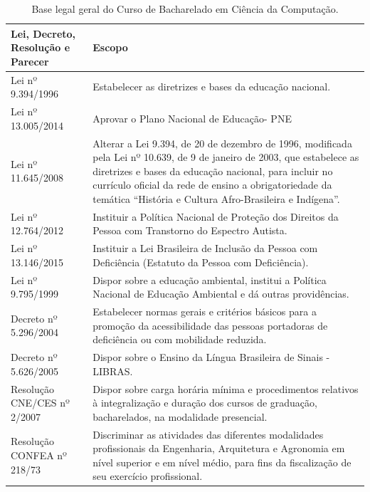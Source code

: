 \documentclass[
	12pt,				%
	openright,			%
  oneside,     %
	a4paper,			%
	english,			%
	french,				%
	spanish,			%
	brazil				%
	]{abntex2}
\begin{document}
\begin{center}
    
    \begin{scriptsize}
        \begin{longtable}{@{}lp{8.7cm}}
            \caption{\label{quadro:base-legal-geral-curso}Base legal geral do Curso de Bacharelado em Ciência da Computação.}\\
    \toprule
    \textbf{Lei, Decreto, Resolução e Parecer} & \textbf{Escopo} \\ 
    \midrule
    Lei nº 9.394/1996 & Estabelecer as diretrizes e bases da educação nacional.\\ \midrule
    Lei nº 13.005/2014	& Aprovar o Plano Nacional de Educação- PNE \\ \midrule
    Lei nº 11.645/2008	& Alterar a Lei 9.394, de 20 de dezembro de 1996, modificada pela Lei nº 10.639, de 9 de janeiro de 2003, que estabelece as diretrizes e bases da educação nacional, para incluir no currículo oficial da rede de ensino a obrigatoriedade da temática ``História e Cultura Afro-Brasileira e Indígena''. \\ \midrule
    Lei nº 12.764/2012 & Instituir a Política Nacional de Proteção dos Direitos da Pessoa com Transtorno do Espectro Autista. \\ \midrule
    Lei nº 13.146/2015 & Instituir a Lei Brasileira de Inclusão da Pessoa com Deficiência (Estatuto da Pessoa com Deficiência). \\ \midrule
    Lei nº 9.795/1999 & Dispor sobre a educação ambiental, institui a Política Nacional de Educação Ambiental e dá outras providências. \\ \midrule
    Decreto nº 5.296/2004 & Estabelecer normas gerais e critérios básicos para a promoção da 	acessibilidade das pessoas portadoras de deficiência ou com mobilidade reduzida. \\ \midrule
    Decreto nº 5.626/2005 & Dispor sobre o Ensino da Língua Brasileira de Sinais - LIBRAS. \\ \midrule
    Resolução CNE/CES nº 2/2007 & Dispor sobre carga horária mínima e procedimentos relativos à integralização e duração dos cursos de graduação, bacharelados, na modalidade presencial. \\ \midrule
    Resolução CONFEA nº 218/73 & Discriminar as atividades das diferentes modalidades profissionais da Engenharia, Arquitetura e Agronomia em nível superior e em nível médio, para fins da fiscalização de seu exercício profissional. \\ \midrule

\end{longtable}
\end{scriptsize}
\end{center}
\end{document}
